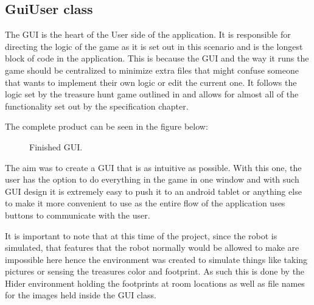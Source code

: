     \subsection{GuiUser class}
      The GUI is the heart of the User side of the application. It is responsible for directing the logic of the game as it is set out in this scenario and is the longest block of code in the application. This is because the GUI and the way it runs the game should be centralized to minimize extra files that might confuse someone that wants to implement their own logic or edit the current one. It follows the logic set by the treasure hunt game outlined in \cite{Elizabeth} and allows for almost all of the functionality set out by the specification chapter.

      The complete product can be seen in the figure below:

      \begin{figure}[htp]
        \caption{Finished GUI.}
      \end{figure}

      The aim was to create a GUI that is as intuitive as possible. With this one, the user has the option to do everything in the game in one window and with such GUI design it is extremely easy to push it to an android tablet or anything else to make it more convenient to use as the entire flow of the application uses buttons to communicate with the user.

      It is important to note that at this time of the project, since the robot is simulated, that features that the robot normally would be allowed to make are impossible here hence the environment was created to simulate things like taking pictures or sensing the treasures color and footprint. As such this is done by the Hider environment holding the footprints at room locations as well as file names for the images held inside the GUI class.

